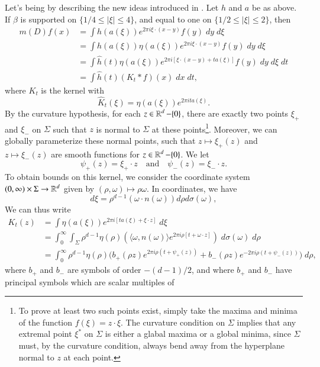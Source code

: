 Let's being by describing the new ideas introduced in \cite{KimQuasiradial}. Let $h$ and $a$ be as above. If $\beta$ is supported on $\{ 1/4 \leq |\xi| \leq 4 \}$, and equal to one on $\{ 1/2 \leq |\xi| \leq 2 \}$, then
%
\begin{align*}
    m(D)f(x) &= \int h(a(\xi)) e^{2 \pi i \xi \cdot (x - y)} f(y)\; dy\; d\xi\\
    &= \int h(a(\xi)) \eta(a(\xi)) e^{2 \pi i \xi \cdot (x - y)} f(y)\; dy\; d\xi\\
    &= \int \widehat{h}(t) \eta(a(\xi)) e^{2 \pi i [ \xi \cdot (x - y) + t a(\xi) ]} f(y)\; dy\; d\xi\; dt\\
    &= \int \widehat{h}(t) (K_t * f)(x)\; dx\; dt,
\end{align*}
%
where $K_t$ is the kernel with
%
\[ \widehat{K}_t(\xi) = \eta(a(\xi)) e^{2 \pi i t a(\xi)}. \]
%
By the curvature hypothesis, for each $z \in \operatorname{\mathbb{R}}^d - \{ 0 \}$, there are exactly two points $\xi_+$ and $\xi_-$ on $\Sigma$ such that $z$ is normal to $\Sigma$ at these points\footnote{To prove at least two such points exist, simply take the maxima and minima of the function $f(\xi) = z \cdot \xi$. The curvature condition on $\Sigma$ implies that any extremal point $\xi^*$ on $\Sigma$ is either a glabal maxima or a global minima, since $\Sigma$ must, by the curvature condition, always bend away from the hyperplane normal to $z$ at each point.}. Moreover, we can globally parameterize these normal points, such that $z \mapsto \xi_+(z)$ and $z \mapsto \xi_-(z)$ are smooth functions for $z \in \operatorname{\mathbb{R}}^d - \{ 0 \}$. We let
%
\[ \psi_+(z) = \xi_+ \cdot z \quad\text{and}\quad \psi_-(z) = \xi_- \cdot z. \]
%
To obtain bounds on this kernel, we consider the coordinate system $(0,\infty) \times \Sigma \to \operatorname{\mathbb{R}}^d$ given by $(\rho,\omega) \mapsto \rho \omega$. In coordinates, we have
%
\[ d\xi = \rho^{d-1} (\omega \cdot n(\omega)) d\rho d\sigma(\omega), \]
%
We can thus write
%
\begin{align*}
    K_t(z) &= \int \eta(a(\xi)) e^{2 \pi i [ t a(\xi) + \xi \cdot z ]}\; d\xi\\
    &= \int_0^\infty \int_\Sigma \rho^{d-1} \eta(\rho) \left( \langle \omega, n(\omega) \rangle e^{2 \pi i \rho [ t + \omega \cdot z ]} \right)\; d\sigma(\omega)\; d\rho\\
    &= \int_0^\infty \rho^{d-1} \eta(\rho) \Big( b_+(\rho z) e^{2 \pi i \rho (t + \psi_+(z))} + b_-(\rho z) e^{- 2 \pi i \rho (t + \psi_-(z))} \Big)\; d\rho,
\end{align*}
%
where $b_+$ and $b_-$ are symbols of order $-(d-1)/2$, and where $b_+$ and $b_-$ have principal symbols which are scalar multiples of
